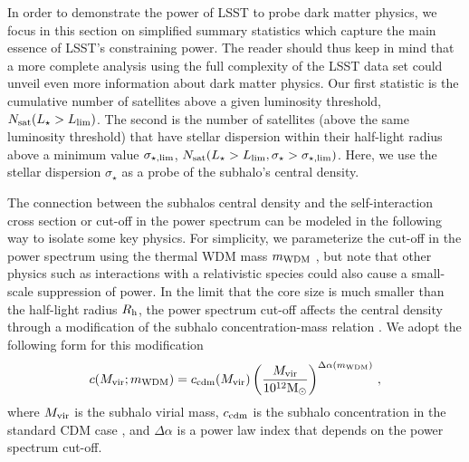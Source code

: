 In order to demonstrate the power of LSST to probe dark matter physics, we focus in this section on simplified summary statistics which capture the main essence of LSST's constraining power. The reader should thus keep in mind that a more complete analysis using the full complexity of the LSST data set could unveil even more information about dark matter physics. Our first statistic is the cumulative number of satellites above a given luminosity threshold, $N_{\rm sat}(L_\star>L_{\rm lim})$. The second is the number of satellites (above the same luminosity threshold) that have stellar dispersion within their half-light radius above a minimum value $\sigma_{\star,\rm lim}$, $N_{\rm sat}(L_\star>L_{\rm lim}, \sigma_\star> \sigma_{\star,\rm lim})$. Here, we use the stellar dispersion $\sigma_\star$ as a probe of the subhalo's central density.

The connection between the subhalos central density and the self-interaction cross section or cut-off in the power spectrum can be modeled in the following way to isolate some key physics. For simplicity, we parameterize the cut-off in the power spectrum using the thermal WDM mass $m_{\rm WDM}$ \citep[see e.g.][]{Bode:2000gq}, but note that other physics such as interactions with a relativistic species \citep[see e.g.][]{Boehm:2004th,Cyr-Racine:2015ihg} could also cause a small-scale suppression of power. In the limit that the core size is much smaller than the half-light radius $R_{\rm h}$, the power spectrum cut-off affects the central density through a modification of the subhalo concentration-mass relation \citep{Dunstan:2011bq,schneider2012,Lovell:2013ola,Bose:2016irl}. We adopt the following form for this modification  
\begin{equation}
c(M_{\rm vir};m_{\rm WDM}) = c_{\rm cdm}(M_{\rm vir})\left(\frac{M_{\rm vir}}{10^{12}{\rm M}_\odot}\right)^{\Delta\alpha(m_{\rm WDM})}\,,
\end{equation}
where $M_{\rm vir}$ is the subhalo virial mass, $c_{\rm cdm}$ is the subhalo concentration in the standard CDM case \citep{Moline:2016pbm}, and $\Delta\alpha$ is a power law index that depends on the power spectrum cut-off. 

